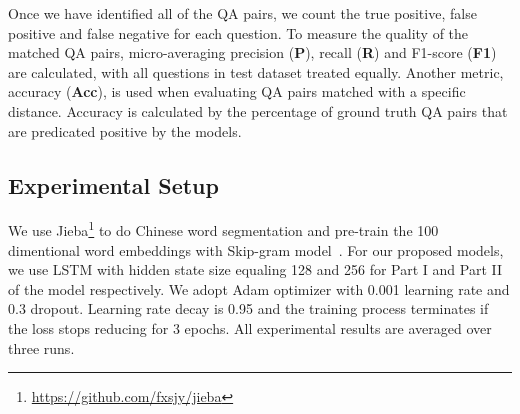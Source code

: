 Once we have identified all of the QA pairs, we count the true positive, 
false positive and false negative for each question. 
To measure the quality of the matched QA pairs, micro-averaging 
precision (\textbf{P}), recall (\textbf{R}) and F1-score (\textbf{F1}) are 
calculated,  with all questions in test dataset treated equally. 
Another metric, accuracy (\textbf{Acc}), is used when evaluating QA pairs matched
with a specific distance. Accuracy is calculated by the percentage of ground
truth QA pairs that are predicated positive by the models.

\subsection{Experimental Setup}
 
We use Jieba\footnote{\url{https://github.com/fxsjy/jieba}} to do Chinese word segmentation and pre-train the 100 dimentional word embeddings with Skip-gram model~\cite{mikolov2013efficient}. For our proposed models, we use LSTM with hidden state size equaling 128 and 256 for Part I and Part II of the model respectively. We adopt Adam optimizer with 0.001 learning rate and 0.3 dropout. 
Learning rate decay is 0.95 and the training process terminates if the 
loss stops reducing for 3 epochs. All experimental results are 
averaged over three runs.
